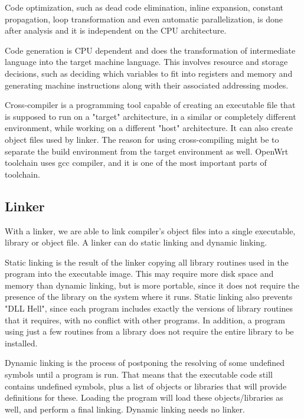 Code optimization, such as dead code elimination, inline expansion, constant propagation, loop transformation and even automatic parallelization, is done after analysis and it is independent on the CPU architecture.

Code generation is CPU dependent and does the transformation of intermediate language into the target machine language.
This involves resource and storage decisions, such as deciding which variables to fit into registers and memory and generating machine instructions along with their associated addressing modes.

Cross-compiler is a programming tool capable of creating an executable file that is supposed to run on a "target" architecture, in a similar or completely different environment, while working on a different "host" architecture.
It can also create object files used by linker.
The reason for using cross-compiling might be to separate the build environment from the target environment as well.
OpenWrt toolchain uses gcc compiler, and it is one of the most important parts of toolchain\cite{compiler}.



\subsection{Linker}

With a linker, we are able to link compiler's object files into a single executable, library or object file. %
A linker can do static linking and dynamic linking.

Static linking is the result of the linker copying all library routines used in the program into the executable image.
This may require more disk space and memory than dynamic linking, but is more portable, since it does not require the presence of the library on the system where it runs.
Static linking also prevents "DLL Hell", since each program includes exactly the versions of library routines that it requires, with no conflict with other programs. In addition, a program using just a few routines from a library does not require the entire library to be installed.

Dynamic linking is the process of postponing the resolving of some undefined symbols until a program is run.
That means that the executable code still contains undefined symbols, plus a list of objects or libraries that will provide definitions for these.
Loading the program will load these objects/libraries as well, and perform a final linking.
Dynamic linking needs no linker.


